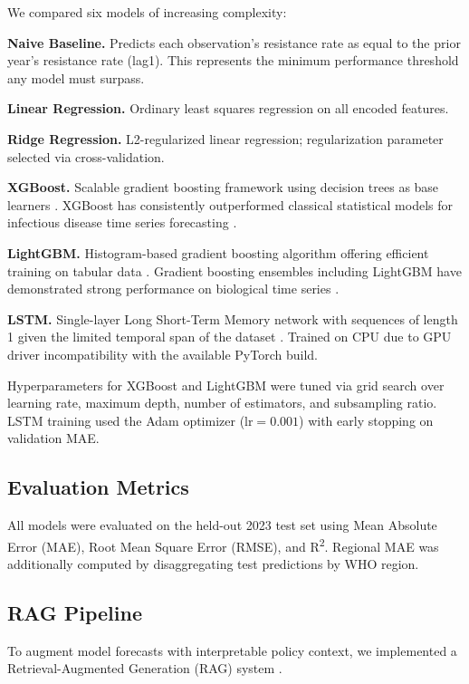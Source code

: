 \documentclass[12pt]{article}
\begin{document}
We compared six models of increasing complexity:

\textbf{Naive Baseline.} Predicts each observation's resistance rate as equal to the prior year's resistance rate (lag1). This represents the minimum performance threshold any model must surpass.

\textbf{Linear Regression.} Ordinary least squares regression on all encoded features.

\textbf{Ridge Regression.} L2-regularized linear regression; regularization parameter selected via cross-validation.

\textbf{XGBoost.} Scalable gradient boosting framework using decision trees as base learners \citep{chen2016}. XGBoost has consistently outperformed classical statistical models for infectious disease time series forecasting \citep{alim2020, fang2022}.

\textbf{LightGBM.} Histogram-based gradient boosting algorithm offering efficient training on tabular data \citep{ke2017}. Gradient boosting ensembles including LightGBM have demonstrated strong performance on biological time series \citep{ahn2023}.

\textbf{LSTM.} Single-layer Long Short-Term Memory network with sequences of length 1 given the limited temporal span of the dataset \citep{chimmula2020}. Trained on CPU due to GPU driver incompatibility with the available PyTorch build.

Hyperparameters for XGBoost and LightGBM were tuned via grid search over learning rate, maximum depth, number of estimators, and subsampling ratio. LSTM training used the Adam optimizer ($\text{lr}=0.001$) with early stopping on validation MAE.

\subsection{Evaluation Metrics}

All models were evaluated on the held-out 2023 test set using Mean Absolute Error (MAE), Root Mean Square Error (RMSE), and R\textsuperscript{2}. Regional MAE was additionally computed by disaggregating test predictions by WHO region.

\subsection{RAG Pipeline}

To augment model forecasts with interpretable policy context, we implemented a Retrieval-Augmented Generation (RAG) system \citep{lewis2020}.
\end{document}
